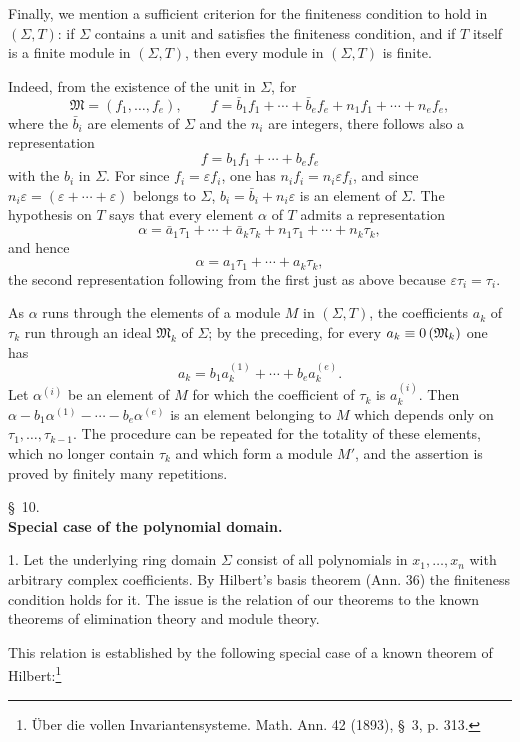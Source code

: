 \documentclass[11pt]{article}
\providecommand{\ideal}[1]{\mathfrak{#1}}
\begin{document}
Finally, we mention a sufficient criterion for the finiteness condition to hold in $(\Sigma,T)$: if $\Sigma$ contains a unit and satisfies the finiteness condition, and if $T$ itself is a finite module in $(\Sigma,T)$, then every module in $(\Sigma,T)$ is finite.

Indeed, from the existence of the unit in $\Sigma$, for
\[
 \ideal M=(f_1,
\ldots,f_e),
 \qquad
 f=\bar b_1f_1+\cdots+\bar b_ef_e+n_1f_1+\cdots+n_ef_e,
\]
where the $\bar b_i$ are elements of $\Sigma$ and the $n_i$ are integers, there follows also a representation
\[
 f=b_1f_1+\cdots+b_ef_e
\]
with the $b_i$ in $\Sigma$. For since $f_i=\varepsilon f_i$, one has $n_if_i=n_i\varepsilon f_i$, and since $n_i\varepsilon=(\varepsilon+\cdots+\varepsilon)$ belongs to $\Sigma$, $b_i=\bar b_i+n_i\varepsilon$ is an element of $\Sigma$. The hypothesis on $T$ says that every element $\alpha$ of $T$ admits a representation
\[
 \alpha=\bar a_1\tau_1+\cdots+\bar a_k\tau_k+n_1\tau_1+\cdots+n_k\tau_k,
\]
and hence
\[
 \alpha=a_1\tau_1+\cdots+a_k\tau_k,
\]
the second representation following from the first just as above because $\varepsilon\tau_i=\tau_i$.

As $\alpha$ runs through the elements of a module $M$ in $(\Sigma,T)$, the coefficients $a_k$ of $\tau_k$ run through an ideal $\ideal M_k$ of $\Sigma$; by the preceding, for every $a_k\eqzero{\ideal M_k}$ one has
\[
 a_k=b_1a_k^{(1)}+\cdots+b_ea_k^{(e)}.
\]
Let $\alpha^{(i)}$ be an element of $M$ for which the coefficient of $\tau_k$ is $a_k^{(i)}$. Then $\alpha-b_1\alpha^{(1)}-\cdots-b_e\alpha^{(e)}$ is an element belonging to $M$ which depends only on $\tau_1,
\ldots,\tau_{k-1}$. The procedure can be repeated for the totality of these elements, which no longer contain $\tau_k$ and which form a module $M'$, and the assertion is proved by finitely many repetitions.

\begin{center}
\S~10.\\[0.25em]
\textbf{Special case of the polynomial domain.}
\end{center}

1. Let the underlying ring domain $\Sigma$ consist of all polynomials in $x_1,
\ldots,x_n$ with arbitrary complex coefficients. By Hilbert's basis theorem (Ann. 36) the finiteness condition holds for it. The issue is the relation of our theorems to the known theorems of elimination theory and module theory.

This relation is established by the following special case of a known theorem of Hilbert:\footnote{Über die vollen Invariantensysteme. Math. Ann. 42 (1893), \S~3, p. 313.}
\end{document}
